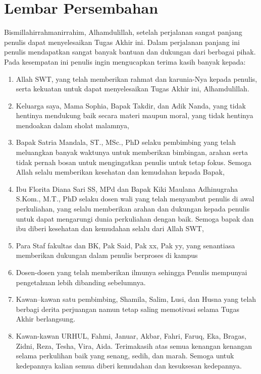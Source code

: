 \chapter*{Lembar Persembahan}

  Bismillahirrahmanirrahim, Alhamdulillah, setelah perjalanan sangat panjang penulis dapat menyelesaikan Tugas Akhir ini. Dalam perjalanan panjang ini penulis mendapatkan sangat banyak bantuan dan dukungan dari berbagai pihak. Pada kesempatan ini penulis ingin mengucapkan terima kasih banyak kepada:
  \begin{enumerate}
      \item Allah SWT, yang telah memberikan rahmat dan karunia-Nya kepada penulis, serta kekuatan untuk dapat menyelesaikan Tugas Akhir ini,
Alhamdulillah.
      \item Keluarga saya, Mama Sophia, Bapak Takdir, dan Adik Nanda, yang tidak hentinya mendukung baik secara materi maupun moral, yang tidak hentinya mendoakan dalam sholat malamnya,
      \item Bapak Satria Mandala, ST., MSc., PhD selaku pembimbing  yang telah meluangkan banyak waktunya untuk memberikan bimbingan, arahan serta tidak pernah bosan untuk mengingatkan penulis untuk tetap fokus. Semoga Allah selalu memberikan kesehatan dan kemudahan kepada Bapak,
      \item Ibu Florita Diana Sari SS, MPd dan Bapak Kiki Maulana Adhinugraha S.Kom., M.T., PhD selaku dosen wali yang telah menyambut penulis di awal perkuliahan, yang selalu memberikan arahan dan dukungan kepada penulis untuk dapat mengarungi dunia perkuliahan dengan baik. Semoga bapak dan ibu diberi kesehatan dan kemudahan selalu dari Allah SWT,
      \item Para Staf fakultas dan BK, Pak Said, Pak xx, Pak yy, yang senantiasa memberikan dukungan dalam penulis berproses di kampus
      \item Dosen-dosen yang telah memberikan ilmunya sehingga Penulis mempunyai pengetahuan lebih dibanding sebelumnya.
      \item Kawan–kawan satu pembimbing, Shamila, Salim, Lusi, dan Husna yang telah berbagi derita perjuangan namun tetap saling memotivasi selama Tugas Akhir berlangsung.
      \item Kawan-kawan URHUL, Fahmi, Januar, Akbar, Fahri, Faruq, Eka, Bragas, Zidni, Reza, Tesha, Vira, Aida. Terimakasih atas semua kenangan kenangan selama perkulihan baik yang senang, sedih, dan marah. Semoga untuk kedepannya kalian semua diberi kemudahan dan kesuksesan kedepannya.

\end{enumerate}
